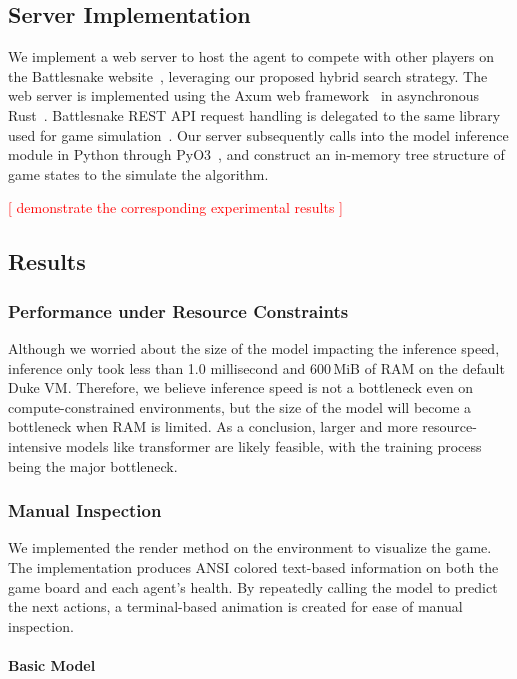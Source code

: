 \documentclass[conference]{IEEEtran}
\newcommand{\todo}[1]{\textcolor{red}{[ #1 ]}}
\begin{document}
\subsection{Server Implementation}

We implement a web server to host the agent to compete with other players on the
Battlesnake website~\cite{battlesnake},
leveraging our proposed hybrid search strategy.
The web server is implemented using the Axum web framework~\cite{axum}
in asynchronous Rust~\cite{tokio}.
Battlesnake REST API request handling is delegated to the same library used for
game simulation~\cite{wrenger2024rusty}.
Our server subsequently calls into the model inference module in Python through
PyO3~\cite{pyo3},
and construct an in-memory tree structure of game states to the simulate the
algorithm.

\todo{demonstrate the corresponding experimental results}

\subsection{Results}

\subsubsection{Performance under Resource Constraints}

Although we worried about the size of the model impacting the inference speed,
inference only took less than 1.0 millisecond and 600\,MiB of RAM on the default
Duke VM. Therefore,
we believe inference speed is not a bottleneck even on compute-constrained
environments,
but the size of the model will become a bottleneck when RAM is limited.
As a conclusion,
larger and more resource-intensive models like transformer are likely feasible,
with the training process being the major bottleneck.

\subsubsection{Manual Inspection}

We implemented the \textsf{render}
method on the environment to visualize the game.
The implementation produces ANSI colored text-based information on both the game
board and each agent's health.
By repeatedly calling the model to predict the next actions,
a terminal-based animation is created for ease of manual inspection.

\paragraph{Basic Model}
\end{document}
